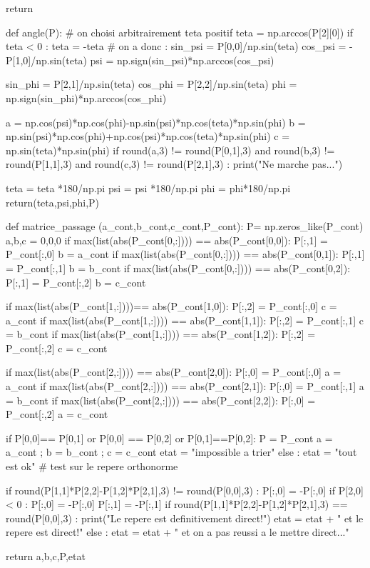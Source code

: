 \begin{customFrame}
    return

def angle(P):
#    on choisi arbitrairement teta positif
    teta = np.arccos(P[2][0])
    if teta < 0 :
        teta = -teta
#        on a donc :
    sin_psi = P[0,0]/np.sin(teta)
    cos_psi = -P[1,0]/np.sin(teta)      
    psi = np.sign(sin_psi)*np.arccos(cos_psi)
        
    sin_phi = P[2,1]/np.sin(teta)
    cos_phi = P[2,2]/np.sin(teta)
    phi = np.sign(sin_phi)*np.arccos(cos_phi)
    
    a = np.cos(psi)*np.cos(phi)-np.sin(psi)*np.cos(teta)*np.sin(phi)
    b = np.sin(psi)*np.cos(phi)+np.cos(psi)*np.cos(teta)*np.sin(phi)
    c = np.sin(teta)*np.sin(phi) 
    if round(a,3) != round(P[0,1],3) and round(b,3) != round(P[1,1],3) and round(c,3) != round(P[2,1],3) : 
        print("Ne marche pas...")

    
    teta = teta *180/np.pi
    psi = psi *180/np.pi
    phi = phi*180/np.pi
    return(teta,psi,phi,P)

def matrice_passage (a_cont,b_cont,c_cont,P_cont):
    P= np.zeros_like(P_cont)
    a,b,c = 0,0,0
    if max(list(abs(P_cont[0,:]))) == abs(P_cont[0,0]): 
        P[:,1] = P_cont[:,0]
        b = a_cont
    if max(list(abs(P_cont[0,:]))) == abs(P_cont[0,1]): 
        P[:,1] = P_cont[:,1]
        b = b_cont
    if max(list(abs(P_cont[0,:]))) == abs(P_cont[0,2]): 
        P[:,1] = P_cont[:,2]
        b = c_cont
        
    if max(list(abs(P_cont[1,:])))== abs(P_cont[1,0]): 
        P[:,2] = P_cont[:,0]
        c = a_cont
    if max(list(abs(P_cont[1,:]))) == abs(P_cont[1,1]): 
        P[:,2] = P_cont[:,1]
        c = b_cont
    if max(list(abs(P_cont[1,:]))) == abs(P_cont[1,2]): 
        P[:,2] = P_cont[:,2]
        c = c_cont
        
    if max(list(abs(P_cont[2,:]))) == abs(P_cont[2,0]): 
        P[:,0] = P_cont[:,0]
        a = a_cont
    if max(list(abs(P_cont[2,:]))) == abs(P_cont[2,1]): 
        P[:,0] = P_cont[:,1]
        a = b_cont
    if max(list(abs(P_cont[2,:]))) == abs(P_cont[2,2]): 
        P[:,0] = P_cont[:,2]   
        a = c_cont
        
    if P[0,0]== P[0,1] or P[0,0] == P[0,2] or P[0,1]==P[0,2]:  
        P = P_cont
        a = a_cont ; b = b_cont ; c = c_cont
        etat = "impossible a trier"
    else : etat = "tout est ok"
#    test sur le repere orthonorme 
    
    if round(P[1,1]*P[2,2]-P[1,2]*P[2,1],3) != round(P[0,0],3) : 
        P[:,0] = -P[:,0]       
    if P[2,0] < 0 :
        P[:,0] = -P[:,0]
        P[:,1] = -P[:,1]
    if round(P[1,1]*P[2,2]-P[1,2]*P[2,1],3) == round(P[0,0],3) : 
        print("Le repere est definitivement direct!") 
        etat = etat + " et le repere est direct!"
    else : etat = etat + " et on a pas reussi a le mettre direct..."
    
    return a,b,c,P,etat
    
\end{customFrame}

